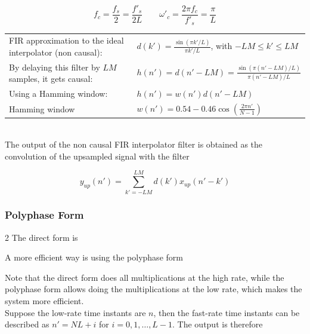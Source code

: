 \begin{equation*}
	f_c = \frac{f_s}{2}=\frac{f'_s}{2L}
	\qquad
	\omega'_c = \frac{2\pi f_c}{f'_s}=\frac{\pi}{L}
\end{equation*}

\begin{tabularx}{\linewidth}{Xl}
	FIR approximation to the ideal interpolator (non causal):
	& $d(k')=\frac{\sin(\pi k'/L)}{\pi k'/L}$, with $-LM\leq k'\leq LM$\\
	By delaying this filter by $LM$ samples, it gets causal:
	& $h(n')=d(n'-LM)=\frac{\sin(\pi (n'-LM)/L)}{\pi (n'-LM)/L}$ \\
	Using a Hamming window: & $h(n')=w(n')d(n'-LM)$ \\
	Hamming window & $w(n') = 0.54-0.46\cos(\frac{2\pi n'}{N-1})$ \\
\end{tabularx} \\

The output of the non causal FIR interpolator filter is obtained as the
convolution of the upsampled signal with the filter

\begin{equation*}
	y_{up}(n') = \sum\limits_{k'=-LM}^{LM}d(k')x_{up}(n'-k')
\end{equation*}


\subsubsection{Polyphase Form}

\begin{multicols}{2}
	The direct form is
	\begin{center}
	\end{center}
\vfill\columnbreak
	A more efficient way is using the polyphase form
	\begin{center}
	\end{center}
\end{multicols}

Note that the direct form does all multiplications at the high rate, while
the polyphase form allows doing the multiplications at the low rate, which
makes the system more efficient. \\

Suppose the low-rate time instants are $n$, then the fast-rate time instants
can be described as $n' = NL+i$ for $i=0,1,\ldots,L-1$. The output is therefore

